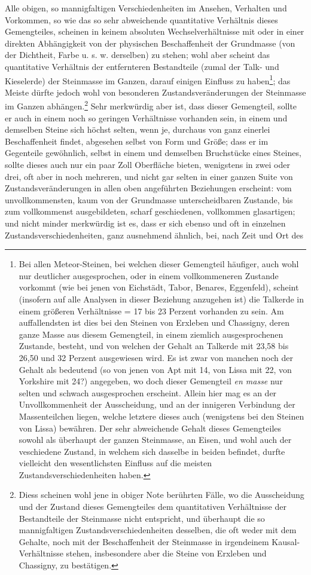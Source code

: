 \documentclass[a4paper, 11pt, oneside, german]{article}
\begin{document}
Alle obigen, so mannigfaltigen Verschiedenheiten im Ansehen, Verhalten und Vorkommen, so wie das so sehr abweichende quantitative Verhältnis dieses Gemengteiles, scheinen in keinem absoluten Wechselverhältnisse mit oder in einer direkten Abhängigkeit von der physischen Beschaffenheit der Grundmasse (von der Dichtheit, Farbe u. s. w. derselben) zu stehen; wohl aber scheint das quantitative Verhältnis der entfernteren Bestandteile (zumal der Talk- und Kieselerde) der Steinmasse im Ganzen, darauf einigen Einfluss zu haben\footnote{Bei allen Meteor-Steinen, bei welchen dieser Gemengteil häufiger, auch wohl nur deutlicher ausgesprochen, oder in einem vollkommeneren Zustande vorkommt (wie bei jenen von Eichstädt, Tabor, Benares, Eggenfeld), scheint (insofern auf alle Analysen in dieser Beziehung anzugehen ist) die Talkerde in einem größeren Verhältnisse = 17 bis 23 Perzent vorhanden zu sein. Am auffallendsten ist dies bei den Steinen von Erxleben und Chassigny, deren ganze Masse aus diesem Gemengteil, in einem ziemlich ausgesprochenen Zustande, besteht, und von welchen der Gehalt an Talkerde mit 23,58 bis 26,50 und 32 Perzent ausgewiesen wird. Es ist zwar von manchen noch der Gehalt als bedeutend (so von jenen von Apt mit 14, von Lissa mit 22, von Yorkshire mit 24?) angegeben, wo doch dieser Gemengteil \emph{en masse} nur selten und schwach ausgesprochen erscheint. Allein hier mag es an der Unvollkommenheit der Ausscheidung, und an der innigeren Verbindung der Massenteilchen liegen, welche letztere dieses auch (wenigstens bei den Steinen von Lissa) bewähren. Der sehr abweichende Gehalt dieses Gemengteiles sowohl als überhaupt der ganzen Steinmasse, an Eisen, und wohl auch der veschiedene Zustand, in welchem sich dasselbe in beiden befindet, durfte vielleicht den wesentlichsten Einfluss auf die meisten Zustandsverschiedenheiten haben.}; das Meiste dürfte jedoch wohl von besonderen Zustandsveränderungen der Steinmasse im Ganzen abhängen.\footnote{Diess scheinen wohl jene in obiger Note berührten Fälle, wo die Ausscheidung und der Zustand dieses Gemengteiles dem quantitativen Verhältnisse der Bestandteile der Steinmasse nicht entspricht, und überhaupt die so mannigfaltigen Zustandsverschiedenheiten desselben, die oft weder mit dem Gehalte, noch mit der Beschaffenheit der Steinmasse in irgendeinem Kausal-Verhältnisse stehen, insbesondere aber die Steine von Erxleben und Chassigny, zu bestätigen.} Sehr merkwürdig aber ist, dass dieser Gemengteil, sollte er auch in einem noch so geringen Verhältnisse vorhanden sein, in einem und demselben Steine sich höchst selten, wenn je, durchaus von ganz einerlei Beschaffenheit findet, abgesehen selbst von Form und Größe; dass er im Gegenteile gewöhnlich, selbst in einem und demselben Bruchstücke eines Steines, sollte dieses auch nur ein paar Zoll Oberfläche bieten, wenigstens in zwei oder drei, oft aber in noch mehreren, und nicht gar selten in einer ganzen Suite von Zustandsveränderungen in allen oben angeführten Beziehungen erscheint: vom unvollkommensten, kaum von der Grundmasse unterscheidbaren Zustande, bis zum vollkommenst ausgebildeten, scharf geschiedenen, vollkommen glasartigen; und nicht minder merkwürdig ist es, dass er sich ebenso und oft in einzelnen Zustandsverschiedenheiten, ganz ausnehmend ähnlich, bei, nach Zeit und Ort des 
\end{document}
